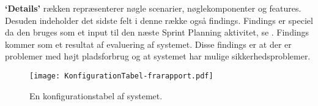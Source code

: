 \textbf{`Details'} rækken repræsenterer nøgle scenarier, nøglekomponenter og features.
Desuden indeholder det sidste felt i denne række også findings.
Findings er speciel da den bruges som et input til den næste Sprint Planning aktivitet, se \citet[Afsnit 8.5, Side 54]{art:essence}. 
Findings kommer som et resultat af evaluering af systemet. 
Disse findings er at der er problemer med højt pladsforbrug og at systemet har mulige sikkerhedsproblemer. 

\begin{figure}
\texttt{[image: KonfigurationTabel-frarapport.pdf]}
\caption{En konfigurationstabel af systemet.}
\label{tab:konfigurationsTabel}
\end{figure}
